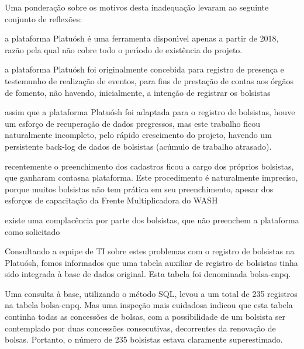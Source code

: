 \documentclass[
12pt,		%
openright,	%
twoside,  %
a4paper,			%
chapter=TITLE,		%
english,			%
french,				%
spanish,			%
brazil				%
]{USPSC-classe/USPSC_RedarTex}
\begin{document}
Uma pondera\c{c}\~ao sobre os motivos desta inadequa\c{c}\~ao levaram ao seguinte conjunto de reflex\~oes:









\begin{alineas}
\item a plataforma Platu\'osh \'e uma ferramenta dispon\'{\i}vel apenas a partir de 2018, raz\~ao pela qual n\~ao cobre todo o per\'{\i}odo de exist\^encia do projeto.
\item a plataforma Platu\'osh foi originalmente concebida para registro de presen\c{c}a e testemunho de realiza\c{c}\~ao de eventos, para fins de presta\c{c}\~ao de contas aos \'org\~aos de fomento, n\~ao havendo, inicialmente, a inten\c{c}\~ao de registrar os bolsistas
\item assim que a plataforma Platu\'osh foi adaptada para o registro de bolsistas, houve um esfor\c{c}o de recupera\c{c}\~ao de dados pregressos, mas este trabalho ficou naturalmente incompleto, pelo r\'apido crescimento do projeto, havendo um persistente back-log de dados de bolsistas (ac\'umulo de trabalho atrasado).
\item recentemente o preenchimento dos cadastros ficou a cargo dos pr\'oprios bolsistas, que ganharam \textquotedbl contas\textquotedbl  na plataforma. Este procedimento \'e naturalmente impreciso, porque muitos bolsistas n\~ao tem pr\'atica em seu preenchimento, apesar dos esfor\c{c}os de capacita\c{c}\~ao da Frente Multiplicadora do WASH
\item existe uma complac\^encia por parte dos bolsistas, que n\~ao preenchem a plataforma como solicitado
\end{alineas}

Consultando a equipe de TI sobre estes problemas com o registro de bolsistas na Platu\'osh, fomos informados que uma tabela auxiliar de registro de bolsistas tinha sido integrada \`a base de dados original. Esta tabela foi denominada \textquotedbl bolsa-cnpq\textquotedbl .








Uma consulta \`a base, utilizando o m\'etodo SQL, levou a um total de 235 registros na tabela \textquotedbl bolsa-cnpq\textquotedbl . Mas uma inspe\c{c}\~ao mais cuidadosa indicou que esta tabela continha todas as concess\~oes de bolsas, com a possibilidade de um bolsista ser contemplado por duas concess\~oes consecutivas, decorrentes da renova\c{c}\~ao de bolsas. Portanto, o n\'umero de 235 bolsistas estava claramente superestimado.
\end{document}
